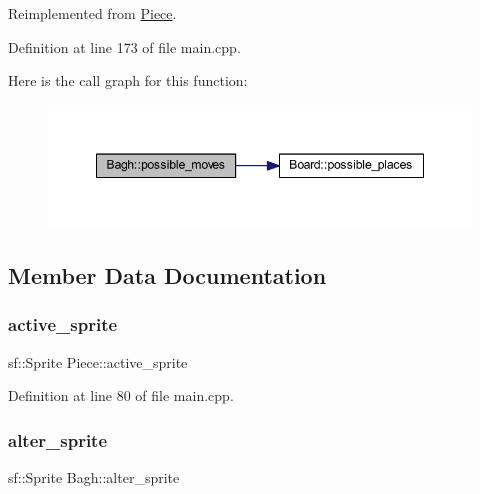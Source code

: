 Reimplemented from \mbox{\hyperlink{class_piece_aaf451c6593a2ed62f8ebe73ba13c0419}{Piece}}.



Definition at line 173 of file main.\+cpp.

Here is the call graph for this function\+:
\nopagebreak
\begin{figure}[H]
\begin{center}
\leavevmode
\includegraphics[width=348pt]{class_bagh_ad98b7e209113ed6e5932ad732283b66a_cgraph}
\end{center}
\end{figure}


\subsection{Member Data Documentation}
\mbox{\label{class_piece_a65fa621a87983d21756c2d2d63e8189b}} 
\subsubsection{\texorpdfstring{active\_sprite}{active\_sprite}}
{\footnotesize\ttfamily sf\+::\+Sprite Piece\+::active\+\_\+sprite\hspace{0.3cm}{\ttfamily [inherited]}}



Definition at line 80 of file main.\+cpp.

\mbox{\label{class_bagh_a74e32ec82d74640ab6ae7e0fbf5d05c4}} 
\subsubsection{\texorpdfstring{alter\_sprite}{alter\_sprite}}
{\footnotesize\ttfamily sf\+::\+Sprite Bagh\+::alter\+\_\+sprite\hspace{0.3cm}{\ttfamily [static]}}



